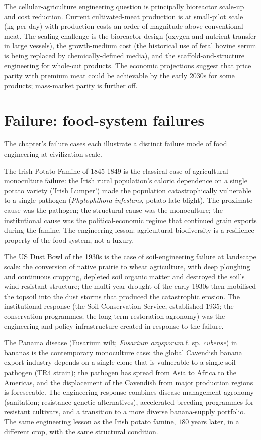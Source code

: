 The cellular-agriculture engineering question is principally bioreactor scale-up and cost reduction. Current cultivated-meat production is at small-pilot scale (kg-per-day) with production costs an order of magnitude above conventional meat. The scaling challenge is the bioreactor design (oxygen and nutrient transfer in large vessels), the growth-medium cost (the historical use of fetal bovine serum is being replaced by chemically-defined media), and the scaffold-and-structure engineering for whole-cut products. The economic projections suggest that price parity with premium meat could be achievable by the early 2030s for some products; mass-market parity is further off.

\section{Failure: food-system failures}

The chapter's failure cases each illustrate a distinct failure mode of food engineering at civilization scale.

The Irish Potato Famine of 1845-1849 is the classical case of agricultural-monoculture failure: the Irish rural population's caloric dependence on a single potato variety ('Irish Lumper') made the population catastrophically vulnerable to a single pathogen (\emph{Phytophthora infestans}, potato late blight). The proximate cause was the pathogen; the structural cause was the monoculture; the institutional cause was the political-economic regime that continued grain exports during the famine. The engineering lesson: agricultural biodiversity is a resilience property of the food system, not a luxury.

The US Dust Bowl of the 1930s \cite{hist:worster-dustbowl-1979} is the case of soil-engineering failure at landscape scale: the conversion of native prairie to wheat agriculture, with deep ploughing and continuous cropping, depleted soil organic matter and destroyed the soil's wind-resistant structure; the multi-year drought of the early 1930s then mobilised the topsoil into the dust storms that produced the catastrophic erosion. The institutional response (the Soil Conservation Service, established 1935; the conservation programmes; the long-term restoration agronomy) was the engineering and policy infrastructure created in response to the failure.

The Panama disease (Fusarium wilt; \emph{Fusarium oxysporum} f. sp. \emph{cubense}) in bananas \cite{paper:ploetz-foc-tr4-2015} is the contemporary monoculture case: the global Cavendish banana export industry depends on a single clone that is vulnerable to a single soil pathogen (TR4 strain); the pathogen has spread from Asia to Africa to the Americas, and the displacement of the Cavendish from major production regions is foreseeable. The engineering response combines disease-management agronomy (sanitation; resistance-genetic alternatives), accelerated breeding programmes for resistant cultivars, and a transition to a more diverse banana-supply portfolio. The same engineering lesson as the Irish potato famine, $180$ years later, in a different crop, with the same structural condition.

